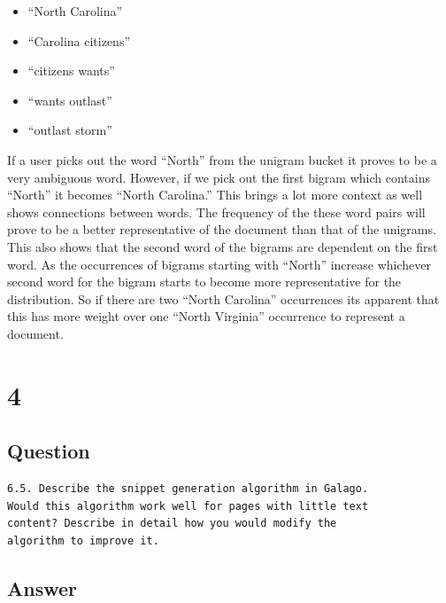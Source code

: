 \documentclass[letterpaper,11pt]{article}
\newcommand*{\srcPath}{../src}%
\begin{document}
\begin{itemize}
  \item ``North Carolina''
  \item ``Carolina citizens''
  \item ``citizens wants''
  \item ``wants outlast''
  \item ``outlast storm''
\end{itemize}

If a user picks out the word ``North'' from the unigram bucket it proves to be a very ambiguous word.
However, if we pick out the first bigram which contains ``North'' it becomes ``North Carolina.''
This brings a lot more context as well shows connections between words.
The frequency of the these word pairs will prove to be a better representative of the document than that of the unigrams.
This also shows that the second word of the bigrams are dependent on the first word.
As the occurrences of bigrams starting with ``North'' increase whichever second word for the bigram starts to become more representative for the distribution.
So if there are two ``North Carolina'' occurrences its apparent that this has more weight over one ``North Virginia'' occurrence to represent a document.

% 

\clearpage


\section*{4}

\subsection*{Question}

\begin{verbatim}
6.5. Describe the snippet generation algorithm in Galago. 
Would this algorithm work well for pages with little text 
content? Describe in detail how you would modify the 
algorithm to improve it.
\end{verbatim}

\subsection*{Answer}
\end{document}
